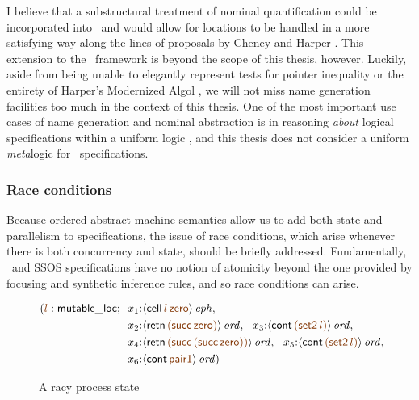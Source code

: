 
I believe that a substructural treatment of nominal quantification
could be incorporated into \sls~and would allow for locations to be
handled in a more satisfying way along the lines of proposals by
Cheney and Harper \cite{cheney12dependent,harper12practical}. This
extension to the \sls~framework is beyond the scope of this thesis,
however. Luckily, aside from being unable to elegantly represent tests
for pointer inequality or the entirety of Harper's Modernized Algol
\cite[Chapter 35]{harper12practical}, we will not miss name generation
facilities too much in the context of this thesis. One of the most important
use cases of name generation and nominal abstraction is in reasoning
{\it about} logical specifications within a uniform logic
\cite{gacek11nominal}, and this thesis does not consider a uniform {\it
  meta}logic for \sls~specifications.

\subsubsection{Race conditions}

Because ordered abstract machine semantics allow us to add both state
and parallelism to specifications, the issue of race conditions, which
arise whenever there is both concurrency and state, should be briefly
addressed. Fundamentally, \sls~and SSOS specifications have no notion
of atomicity beyond the one provided by focusing and synthetic
inference rules, and so race conditions can arise. 


\begin{figure}[ht]
\begin{align*}
(\lf{l}:{\sf mutable\_loc}; &
~~ x_1{:}\iseph{\susp{{\sf cell}\,\lf{l}\,\lf{\sf zero}}}, \\
& ~~ x_2{:}\istrue{\susp{{\sf retn}\,\lf{\sf (succ\,zero)}}},
~~ x_3{:}\istrue{\susp{{\sf cont}\,\lf{({\sf set2}\,l)}}},
\\
& ~~ x_4{:}\istrue{\susp{{\sf retn}\,\lf{\sf (succ\,(succ\,zero))}}},
~~ x_5{:}\istrue{\susp{{\sf cont}\,\lf{({\sf set2}\,l)}}},
\\
&~~ x_6{:}\istrue{\susp{{\sf cont}\,\lf{\sf pair1}}})
\end{align*}
\caption{A racy process state}
\label{fig:racystate}
\end{figure}


